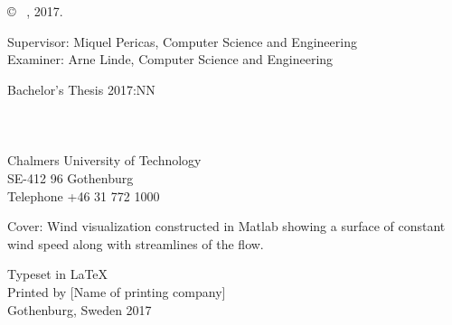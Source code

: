 \newpage
\thispagestyle{plain}
\vspace*{4.5cm}
\varHeadline \\
\varSubtitle \\
\varNames \setlength{\parskip}{1cm}

\copyright ~ \varNames, 2017. \setlength{\parskip}{1cm}

Supervisor: Miquel Pericas, Computer Science and Engineering\\
Examiner: Arne Linde, Computer Science and Engineering \setlength{\parskip}{1cm}

Bachelor's Thesis 2017:NN\\	%
\varDepartment \\
\varDivision \\
\varResearchGroupName\\
Chalmers University of Technology\\
SE-412 96 Gothenburg\\
Telephone +46 31 772 1000 \setlength{\parskip}{0.5cm}

\vfill
Cover: Wind visualization constructed in Matlab showing a surface of constant wind speed along with streamlines of the flow. \setlength{\parskip}{0.5cm}

Typeset in \LaTeX \\
Printed by [Name of printing company]\\
Gothenburg, Sweden 2017

